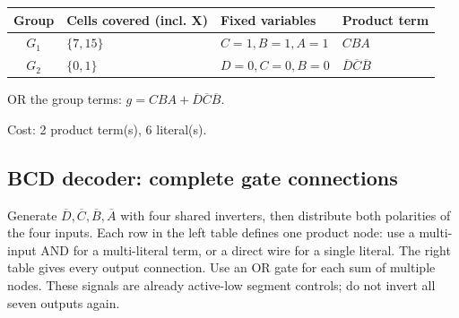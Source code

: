 \documentclass[a4paper,11pt]{article}
\begin{document}
\begin{minipage}{\textwidth}
\begin{center}\small
\begin{tabular}{clll}
\toprule
Group & Cells covered (incl. X) & Fixed variables & Product term\\\midrule
\textcolor{blue!75!black}{$G_{1}$} & $\{7,15\}$ & $C=1,B=1,A=1$ & $CBA$\\
\textcolor{red!75!black}{$G_{2}$} & $\{0,1\}$ & $D=0,C=0,B=0$ & $\overline{D}\overline{C}\overline{B}$\\
\bottomrule\end{tabular}\end{center}


\noindent OR the group terms: $\boxed{g=CBA + \overline{D}\overline{C}\overline{B}}$.

\noindent Cost: 2 product term(s), 6 literal(s).

\end{minipage}\par\vspace{0.25cm}

\clearpage\subsection{BCD decoder: complete gate connections}

Generate $\overline D,\overline C,\overline B,\overline A$ with four shared
inverters, then distribute both polarities of the four inputs. Each row in the left table
defines one product node: use a multi-input AND for a multi-literal term, or a direct wire
for a single literal. The right table gives every output connection. Use an OR gate for
each sum of multiple nodes. These signals are already active-low segment controls;
do not invert all seven outputs again.
\end{document}

